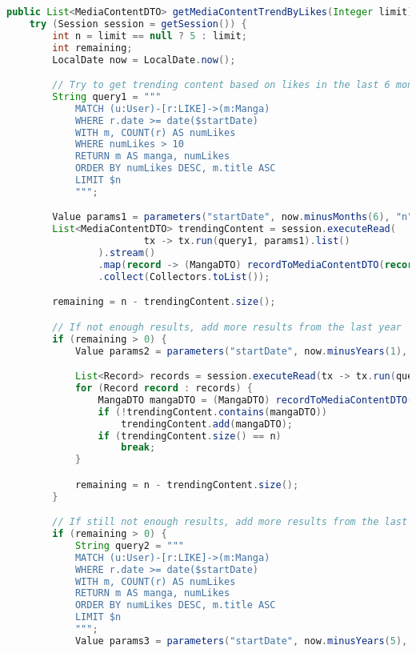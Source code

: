 \begin{mdframed}[style=customstyle]
\begin{lstlisting}[language=java]
public List<MediaContentDTO> getMediaContentTrendByLikes(Integer limit) throws DAOException {
    try (Session session = getSession()) {
        int n = limit == null ? 5 : limit;
        int remaining;
        LocalDate now = LocalDate.now();

        // Try to get trending content based on likes in the last 6 months
        String query1 = """
            MATCH (u:User)-[r:LIKE]->(m:Manga)
            WHERE r.date >= date($startDate)
            WITH m, COUNT(r) AS numLikes
            WHERE numLikes > 10
            RETURN m AS manga, numLikes
            ORDER BY numLikes DESC, m.title ASC
            LIMIT $n
            """;

        Value params1 = parameters("startDate", now.minusMonths(6), "n", n);
        List<MediaContentDTO> trendingContent = session.executeRead(
                        tx -> tx.run(query1, params1).list()
                ).stream()
                .map(record -> (MangaDTO) recordToMediaContentDTO(record))
                .collect(Collectors.toList());

        remaining = n - trendingContent.size();

        // If not enough results, add more results from the last year
        if (remaining > 0) {
            Value params2 = parameters("startDate", now.minusYears(1), "n", remaining);

            List<Record> records = session.executeRead(tx -> tx.run(query1, params2).list());
            for (Record record : records) {
                MangaDTO mangaDTO = (MangaDTO) recordToMediaContentDTO(record);
                if (!trendingContent.contains(mangaDTO))
                    trendingContent.add(mangaDTO);
                if (trendingContent.size() == n)
                    break;
            }

            remaining = n - trendingContent.size();
        }

        // If still not enough results, add more results from the last 5 years
        if (remaining > 0) {
            String query2 = """
            MATCH (u:User)-[r:LIKE]->(m:Manga)
            WHERE r.date >= date($startDate)
            WITH m, COUNT(r) AS numLikes
            RETURN m AS manga, numLikes
            ORDER BY numLikes DESC, m.title ASC
            LIMIT $n
            """;
            Value params3 = parameters("startDate", now.minusYears(5), "n", remaining);


\end{lstlisting}
\end{mdframed}

